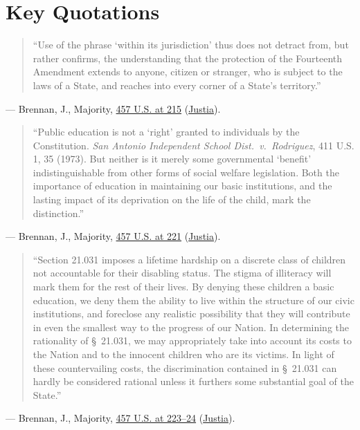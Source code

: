 \documentclass[12pt]{article}
\begin{document}
\section{Key Quotations}
\begin{quote}
``Use of the phrase `within its jurisdiction' thus does not detract from, but rather confirms, the understanding that the protection of the Fourteenth Amendment extends to anyone, citizen or stranger, who is subject to the laws of a State, and reaches into every corner of a State's territory.''
\end{quote}
\noindent --- Brennan, J., Majority, \href{https://www.law.cornell.edu/supremecourt/text/457/202}{457 U.S. at 215} (\href{https://supreme.justia.com/cases/federal/us/457/202/}{Justia}).

\begin{quote}
``Public education is not a `right' granted to individuals by the Constitution. \textit{San Antonio Independent School Dist.\ v.\ Rodriguez}, 411 U.S. 1, 35 (1973). But neither is it merely some governmental `benefit' indistinguishable from other forms of social welfare legislation. Both the importance of education in maintaining our basic institutions, and the lasting impact of its deprivation on the life of the child, mark the distinction.''
\end{quote}
\noindent --- Brennan, J., Majority, \href{https://www.law.cornell.edu/supremecourt/text/457/202}{457 U.S. at 221} (\href{https://supreme.justia.com/cases/federal/us/457/202/}{Justia}).

\begin{quote}
``Section 21.031 imposes a lifetime hardship on a discrete class of children not accountable for their disabling status. The stigma of illiteracy will mark them for the rest of their lives. By denying these children a basic education, we deny them the ability to live within the structure of our civic institutions, and foreclose any realistic possibility that they will contribute in even the smallest way to the progress of our Nation. In determining the rationality of \S~21.031, we may appropriately take into account its costs to the Nation and to the innocent children who are its victims. In light of these countervailing costs, the discrimination contained in \S~21.031 can hardly be considered rational unless it furthers some substantial goal of the State.''
\end{quote}
\noindent --- Brennan, J., Majority, \href{https://www.law.cornell.edu/supremecourt/text/457/202}{457 U.S. at 223--24} (\href{https://supreme.justia.com/cases/federal/us/457/202/}{Justia}).
\end{document}
